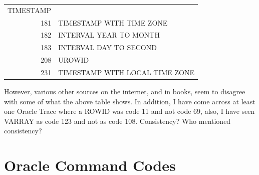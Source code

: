 \begin{appendix}
\begin{longtable}[]{@{}r|l@{}}
\begin{minipage}[t]{0.43\columnwidth}
TIMESTAMP\strut
\end{minipage}\tabularnewline
\begin{minipage}[t]{0.09\columnwidth}\raggedright\strut
181\strut
\end{minipage} & \begin{minipage}[t]{0.43\columnwidth}\raggedright\strut
TIMESTAMP WITH TIME ZONE\strut
\end{minipage}\tabularnewline
\begin{minipage}[t]{0.09\columnwidth}\raggedright\strut
182\strut
\end{minipage} & \begin{minipage}[t]{0.43\columnwidth}\raggedright\strut
INTERVAL YEAR TO MONTH\strut
\end{minipage}\tabularnewline
\begin{minipage}[t]{0.09\columnwidth}\raggedright\strut
183\strut
\end{minipage} & \begin{minipage}[t]{0.43\columnwidth}\raggedright\strut
INTERVAL DAY TO SECOND\strut
\end{minipage}\tabularnewline
\begin{minipage}[t]{0.09\columnwidth}\raggedright\strut
208\strut
\end{minipage} & \begin{minipage}[t]{0.43\columnwidth}\raggedright\strut
UROWID\strut
\end{minipage}\tabularnewline
\begin{minipage}[t]{0.09\columnwidth}\raggedright\strut
231\strut
\end{minipage} & \begin{minipage}[t]{0.43\columnwidth}\raggedright\strut
TIMESTAMP WITH LOCAL TIME ZONE\strut
\end{minipage}\tabularnewline
\bottomrule
\end{longtable}

However, various other sources on the internet, and in books, seem to
disagree with some of what the above table shows. In addition, I have
come across at least one Oracle Trace where a ROWID was code 11 and not
code 69, also, I have seen VARRAY as code 123 and not as code 108.
Consistency? Who mentioned consistency?

\chapter{Oracle Command Codes}\label{oracle-command-codes}


\end{appendix}
